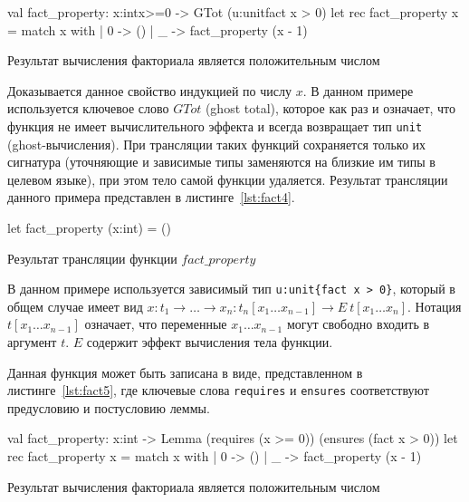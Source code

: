 \documentclass[12pt]{matmex-diploma}
\begin{document}
\begin{listing}
\begin{pyglist}[language=ocaml,numbers=none,numbersep=5pt, fontsize=\small]
val fact_property: x:int{x>=0} -> GTot (u:unit{fact x > 0})
let rec fact_property x =
   match x with
   | 0 -> ()
   | _ -> fact_property (x - 1)
\end{pyglist}
\caption{Результат вычисления факториала является положительным числом}
\label{lst:fact3} 
\end{listing}

Доказывается данное свойство индукцией по числу $x$. В данном примере используется ключевое слово $GTot$ (ghost total), которое как раз и означает, что функция не имеет вычислительного эффекта и всегда возвращает тип \verb|unit| (ghost-вычисления). При трансляции таких функций сохраняется только их сигнатура (уточняющие и зависимые типы заменяются на близкие им типы в целевом языке), при этом тело самой функции удаляется. Результат трансляции данного примера представлен в листинге~\ref{lst:fact4}.

\begin{listing}
\begin{pyglist}[language=ocaml,numbers=none,numbersep=5pt, fontsize=\small]
let fact_property (x:int) = ()
\end{pyglist}
\caption{Результат трансляции функции $fact\_property$}
\label{lst:fact4} 
\end{listing}

В данном примере используется зависимый тип \verb|u:unit{fact x > 0}|, который в общем случае имеет  вид $x:t_1 \to \ldots \to x_n:t_n [x_1 \ldots x_{n-1}] \to E~t [x_1 \ldots x_n]$. Нотация $t [x_1 \ldots x_{n-1}]$ означает, что переменные $x_1 \ldots x_{n-1}$ могут свободно входить в аргумент $t$. $E$ содержит эффект вычисления тела функции.

Данная функция может быть записана в виде, представленном в листинге~\ref{lst:fact5}, где ключевые слова \verb|requires| и \verb|ensures| соответствуют предусловию и постусловию леммы.

\begin{listing}
\begin{pyglist}[language=ocaml,numbers=none,numbersep=5pt, fontsize=\small]
val fact_property: x:int -> Lemma
    (requires (x >= 0))
    (ensures (fact x > 0))
let rec fact_property x =
   match x with
   | 0 -> ()
   | _ -> fact_property (x - 1)
\end{pyglist}
\caption{Результат вычисления факториала является положительным числом}
\label{lst:fact5} 
\end{listing}
\end{document}
